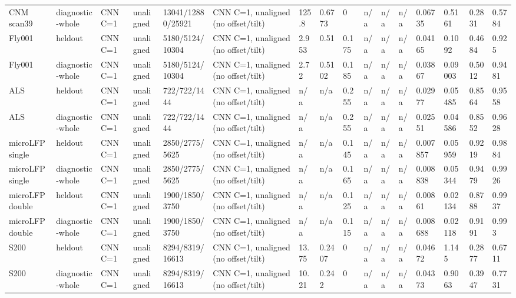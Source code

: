 \begin{tabular}{llllllllllllllll}
CNM scan39 & diagnostic-whole & CNN C=1 & unaligned & 13041/12880/25921 & CNN C=1, unaligned (no offset/tilt) & 125.8 & 0.6773 & 0 & n/a & n/a & n/a & 0.06735 & 0.5161 & 0.2831 & 0.5784 \\
Fly001 & heldout & CNN C=1 & unaligned & 5180/5124/10304 & CNN C=1, unaligned (no offset/tilt) & 2.953 & 0.51 & 0.175 & n/a & n/a & n/a & 0.04165 & 0.1092 & 0.4684 & 0.925 \\
Fly001 & diagnostic-whole & CNN C=1 & unaligned & 5180/5124/10304 & CNN C=1, unaligned (no offset/tilt) & 2.72 & 0.5102 & 0.185 & n/a & n/a & n/a & 0.03867 & 0.09003 & 0.5012 & 0.9481 \\
ALS & heldout & CNN C=1 & unaligned & 722/722/1444 & CNN C=1, unaligned (no offset/tilt) & n/a & n/a & 0.255 & n/a & n/a & n/a & 0.02977 & 0.05485 & 0.8564 & 0.9558 \\
ALS & diagnostic-whole & CNN C=1 & unaligned & 722/722/1444 & CNN C=1, unaligned (no offset/tilt) & n/a & n/a & 0.255 & n/a & n/a & n/a & 0.02551 & 0.04586 & 0.8552 & 0.9628 \\
microLFP single & heldout & CNN C=1 & unaligned & 2850/2775/5625 & CNN C=1, unaligned (no offset/tilt) & n/a & n/a & 0.145 & n/a & n/a & n/a & 0.007857 & 0.05959 & 0.9219 & 0.9884 \\
microLFP single & diagnostic-whole & CNN C=1 & unaligned & 2850/2775/5625 & CNN C=1, unaligned (no offset/tilt) & n/a & n/a & 0.165 & n/a & n/a & n/a & 0.008838 & 0.05344 & 0.9479 & 0.9926 \\
microLFP double & heldout & CNN C=1 & unaligned & 1900/1850/3750 & CNN C=1, unaligned (no offset/tilt) & n/a & n/a & 0.125 & n/a & n/a & n/a & 0.00861 & 0.02134 & 0.8788 & 0.9937 \\
microLFP double & diagnostic-whole & CNN C=1 & unaligned & 1900/1850/3750 & CNN C=1, unaligned (no offset/tilt) & n/a & n/a & 0.115 & n/a & n/a & n/a & 0.008688 & 0.02118 & 0.9191 & 0.993 \\
S200 & heldout & CNN C=1 & unaligned & 8294/8319/16613 & CNN C=1, unaligned (no offset/tilt) & 13.75 & 0.2407 & 0 & n/a & n/a & n/a & 0.04672 & 1.145 & 0.2877 & 0.6711 \\
S200 & diagnostic-whole & CNN C=1 & unaligned & 8294/8319/16613 & CNN C=1, unaligned (no offset/tilt) & 10.21 & 0.242 & 0 & n/a & n/a & n/a & 0.04373 & 0.9063 & 0.3947 & 0.7731 \\
\bottomrule
\end{tabular}
